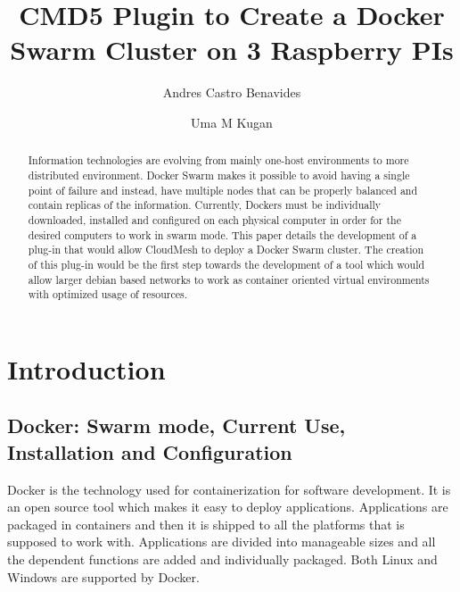 \documentclass[sigconf]{acmart}
\begin{document}
	\title{CMD5 Plugin to Create a Docker Swarm Cluster on 3 Raspberry PIs}
	
	\author{Andres Castro Benavides}
	
	\author{Uma M Kugan}
	\renewcommand{\shortauthors}{Uma Kugan, Andres Castro}
	\begin{abstract}
		Information technologies are evolving from mainly one-host environments to more distributed environment. Docker Swarm makes it possible to avoid having a single point of failure and instead, have multiple nodes that can be properly balanced and contain replicas of the information. Currently, Dockers must be individually downloaded, installed and configured on each physical computer in order for the desired computers to work in swarm mode. This paper details the development of a plug-in that would allow CloudMesh to deploy a Docker Swarm cluster.  The creation of this plug-in would be the first step towards the development of a tool which would allow larger debian based networks to work as container oriented virtual environments with optimized usage of resources.
	\end{abstract}
	
	
	\maketitle
	
	\section{Introduction}
	
	\subsection{Docker: Swarm mode, Current Use, Installation and Configuration}
	Docker is the technology used for containerization for software development. It is an open source tool which makes it easy to deploy applications. Applications are packaged in containers and then it is shipped to all the platforms that is supposed to work with. Applications are divided into manageable sizes and all the dependent functions are added and individually packaged. Both Linux and Windows are supported by Docker.
	
\end{document}
